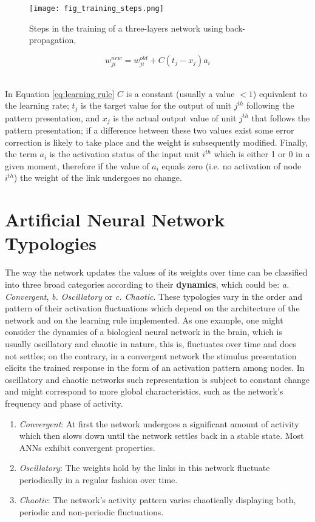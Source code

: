 \documentclass{WileySev}
\begin{document}
\begin{figure}
  \texttt{[image: fig\_training\_steps.png]}
  \centering
  \caption{Steps in the training of a three-layers network using back-propagation, \cite{friedenberg2011cognitive}}
  \label{fig:training_steps}
\end{figure}

\begin{equation}
w_{ji}^{\textit{new}}=w_{ji}^{\textit{old}}+C(t_j-x_j)a_i \label{eq:learning rule}
\end{equation}
\

In Equation \ref{eq:learning rule} $C$ is a constant (usually a value $< 1$) equivalent to the learning rate; $t_j$ is the target value for the output of unit $j^{th}$ following the pattern presentation, and $x_j$ is the actual output value of unit $j^{th}$ that follows the pattern presentation; if a difference between these two values exist some error correction is likely to take place and the weight is subsequently modified. Finally, the term $a_i$ is the activation status of the input unit $i^{th}$ which is either 1 or 0 in a given moment, therefore if the value of $a_i$ equals zero (i.e. no activation of node $i^{th}$) the weight of the link undergoes no change.

\section{Artificial Neural Network Typologies}

The way the network  updates the values of its weights over time can be classified into three broad categories according to their \textbf{dynamics}, which could be: \textit{a. Convergent}, \textit{b. Oscillatory} or \textit{c. Chaotic}. These typologies vary in the order and pattern of their activation fluctuations which depend on the architecture of the network and on the learning rule implemented. As one example, one might consider the dynamics of a biological neural network in the brain, which is usually oscillatory and chaotic in nature, this is, fluctuates over time and does not settles; on the contrary, in a convergent network the stimulus presentation elicits the trained response in the form of an activation pattern among nodes. In oscillatory and chaotic networks such representation is subject to constant change and might correspond to more global characteristics, such as the network’s frequency and phase of activity.

\begin{enumerate}
  \item{\textit{Convergent}: At first the network undergoes a significant amount of activity which then slows down until the network settles back in a stable state. Most ANNs exhibit convergent properties.}
  \item{\textit{Oscillatory}: The weights hold by the links in this network fluctuate periodically in a regular fashion over time.}
  \item{\textit{Chaotic}: The network's activity pattern varies chaotically displaying both, periodic and non-periodic fluctuations.}
\end{enumerate}
\end{document}

